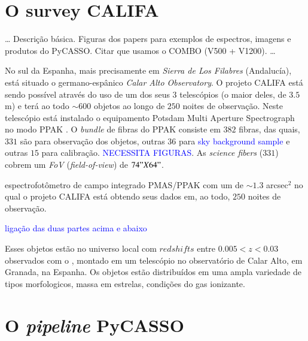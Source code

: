 \section{O survey CALIFA}
\label{sec:CALePyC:Apresent}

\ldots
Descrição básica. Figuras dos papers para exemplos de espectros, imagens e 
produtos do PyCASSO. Citar que usamos o COMBO (V500 + V1200).
\ldots

No sul da Espanha, mais precisamente em {\em Sierra de Los Filabres}
(Andalucía), está situado o germano-espânico {\em Calar Alto Observatory}. O
projeto CALIFA está sendo possível através do uso de um dos seus $3$ telescópios
(o maior deles, de $3.5$m) e terá ao todo $\sim 600$ objetos ao longo de $250$
noites de observação. Neste telescópio está instalado o equipamento Potsdam
Multi Aperture Spectrograph \citep[PMAS; ][]{Roth2005} no modo PPAK
\citep{Verheijen2004, Kelz2006}. O {\em bundle} de fibras do PPAK consiste em
$382$ fibras, das quais, $331$ são para observação dos objetos, outras
$36$ para \fixme \textcolor{blue}{sky background sample} e outras $15$ para
calibração. \fixme \textcolor{blue}{NECESSITA FIGURAS}. As {\em science fibers}
($331$) cobrem um {\em FoV} ({\em field-of-view}) de $74" X 64"$.

espectrofotômetro de campo integrado PMAS/PPAK com um  de $\sim1.3$ arcsec$^2$ no qual o projeto CALIFA está obtendo seus dados em, ao todo, $250$ noites de
observação.

\fixme \textcolor{blue}{ligação das duas partes acima e abaixo}
 
Esses objetos estão no universo local com $redshifts$ entre $0.005 < z < 0.03$
observados com o , montado em um telescópio no
observatório de Calar Alto, em Granada, na Espanha. Os objetos estão
distribuídos em uma ampla variedade de tipos morfologicos, massa em estrelas,
condições do gas ionizante.


\section{O {\em pipeline} PyCASSO}
\label{sec:CALePyC:PyCASSO}


